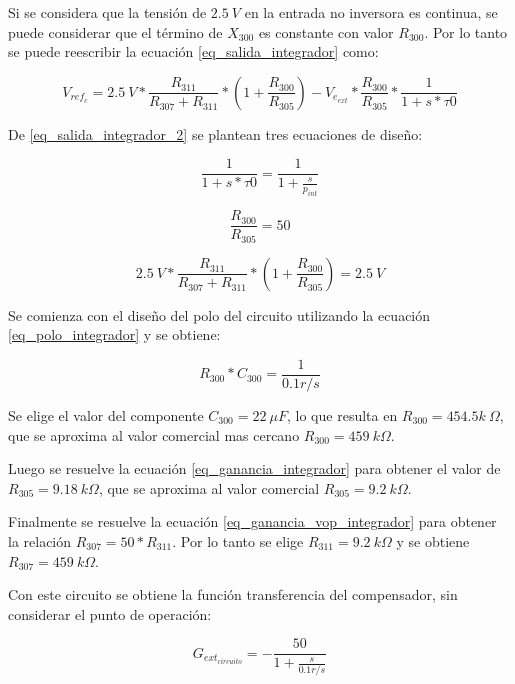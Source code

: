 Si se considera que la tensión de $2.5\:V$ en la entrada no inversora es continua, se puede considerar que el término de $X_{300}$ es constante con valor $R_{300}$. Por lo tanto se puede reescribir la ecuación \ref{eq_salida_integrador} como:

\begin{equation} \label{eq_salida_integrador_2}
	V_{ref_c}=2.5\:V*\frac{R_{311}}{R_{307}+R_{311}}*(1+\frac{R_{300}}{R_{305}})-V_{e_{ext}}*\frac{R_{300}}{R_{305}}*\frac{1}{1+s*\tau 0}
\end{equation}

De \ref{eq_salida_integrador_2} se plantean tres ecuaciones de diseño:

\begin{equation} \label{eq_polo_integrador}
	\frac{1}{1+s*\tau 0}=\frac{1}{1+\frac{s}{p_{int}}}
\end{equation}

\begin{equation} \label{eq_ganancia_integrador}
	\frac{R_{300}}{R_{305}}=50
\end{equation}


\begin{equation} \label{eq_ganancia_vop_integrador}
	2.5\:V*\frac{R_{311}}{R_{307}+R_{311}}*(1+\frac{R_{300}}{R_{305}})=2.5\:V
\end{equation}

Se comienza con el diseño del polo del circuito utilizando la ecuación \ref{eq_polo_integrador} y se obtiene:

\begin{equation}
	R_{300}*C_{300}=\frac{1}{0.1r/s}
\end{equation}

Se elige el valor del componente $C_{300}=22\:\mu F$, lo que resulta en $R_{300}=454.5k\:\Omega$, que se aproxima al valor comercial mas cercano $R_{300}=459\:k\Omega$.

Luego se resuelve la ecuación \ref{eq_ganancia_integrador} para obtener el valor de $R_{305}=9.18\:k\Omega$, que se aproxima al valor comercial $R_{305}=9.2\:k\Omega$.

Finalmente se resuelve la ecuación \ref{eq_ganancia_vop_integrador} para obtener la relación $R_{307}=50*R_{311}$. Por lo tanto se elige $R_{311}=9.2\:k\Omega$ y se obtiene $R_{307}=459\:k\Omega$.


Con este circuito se obtiene la función transferencia del compensador, sin considerar el punto de operación:

\begin{equation} \label{eq_gexterno_circuito}
	G_{ext_{circuito}}=-\frac{50}{1+\frac{s}{0.1r/s}}
\end{equation}


